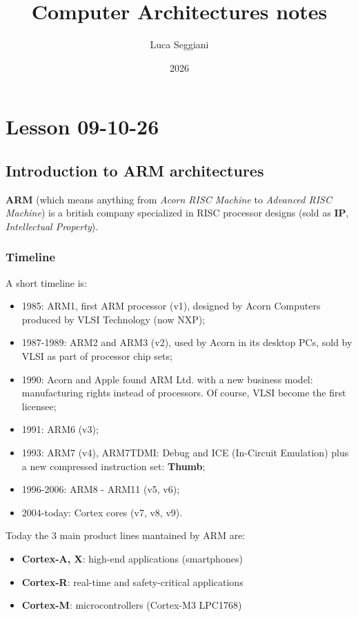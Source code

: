 \documentclass[a4paper,11pt]{article}
\title{Computer Architectures notes}
\author{Luca Seggiani}
\date{2026}
\begin{document}
\section{Lesson 09-10-26}

\thispagestyle{empty}
\pagestyle{fancy}

\subsection{Introduction to ARM architectures}

\textbf{ARM} (which means anything from \textit{Acorn RISC Machine} to \textit{Advanced RISC Machine}) is a british company specialized in RISC processor designs (sold as \textbf{IP}, \textit{Intellectual Property}).

\subsubsection{Timeline}

A short timeline is:
\begin{itemize}
	\item 1985: ARM1, first ARM processor (v1), designed by Acorn Computers produced by VLSI Technology (now NXP);
	\item 1987-1989: ARM2 and ARM3 (v2), used by Acorn in its desktop PCs, sold by VLSI as part of processor chip sets;
	\item 1990: Acorn and Apple found ARM Ltd. with a new business model: manufacturing rights instead of processors. Of course, VLSI become the first licensee;
	\item 1991: ARM6 (v3);
	\item 1993: ARM7 (v4), ARM7TDMI: Debug and ICE (In-Circuit Emulation) plus a new compressed instruction set: \textbf{Thumb};
	\item 1996-2006: ARM8 - ARM11 (v5, v6);
	\item 2004-today: Cortex cores (v7, v8, v9).
\end{itemize}

Today the 3 main product lines mantained by ARM are:
\begin{itemize}
	\item \textbf{Cortex-A, X}: high-end applications (smartphones)
	\item \textbf{Cortex-R}: real-time and safety-critical applications
	\item \textbf{Cortex-M}: microcontrollers (Cortex-M3 LPC1768)
\end{itemize}
\end{document}
